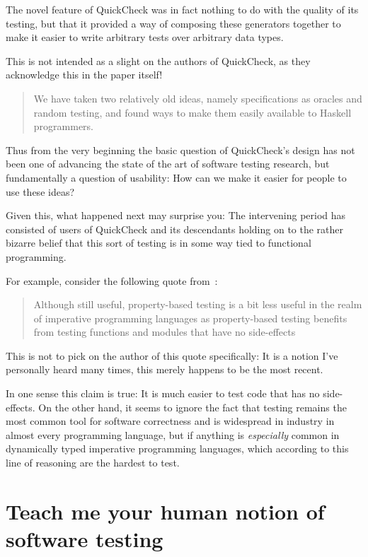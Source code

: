 The novel feature of QuickCheck was in fact nothing to do with the quality of its testing,
but that it provided a way of composing these generators together to make it easier to write arbitrary tests over arbitrary data types.

This is not intended as a slight on the authors of QuickCheck,
as they acknowledge this in the paper itself!

\begin{quote}
We have taken two relatively old ideas, namely specifications as oracles and random testing,
and found ways to make them easily available to Haskell programmers.
\end{quote}

Thus from the very beginning the basic question of QuickCheck's design has not been one of advancing the state of the art of software testing research,
but fundamentally a question of usability:
How can we make it easier for people to use these ideas?

Given this,
what happened next may surprise you:
The intervening period has consisted of users of QuickCheck and its descendants holding on to the rather bizarre belief that this sort of testing is in some way tied to functional programming.

For example,
consider the following quote from~\cite{matela2017tools}:

\begin{quote}
Although still useful,
property-based testing is a bit less useful in the realm of imperative programming languages as property-based testing
benefits from testing functions and modules that have no side-effects
\end{quote}

This is not to pick on the author of this quote specifically:
It is a notion I've personally heard many times,
this merely happens to be the most recent.

In one sense this claim is true:
It is much easier to test code that has no side-effects.
On the other hand,
it seems to ignore the fact that testing remains the most common tool for software correctness and is widespread in industry in almost every programming language,
but if anything is \emph{especially} common in dynamically typed imperative programming languages,
which according to this line of reasoning are the hardest to test.

\chapter{Teach me your human notion of software testing}\label{chap:purposesoftesting}

